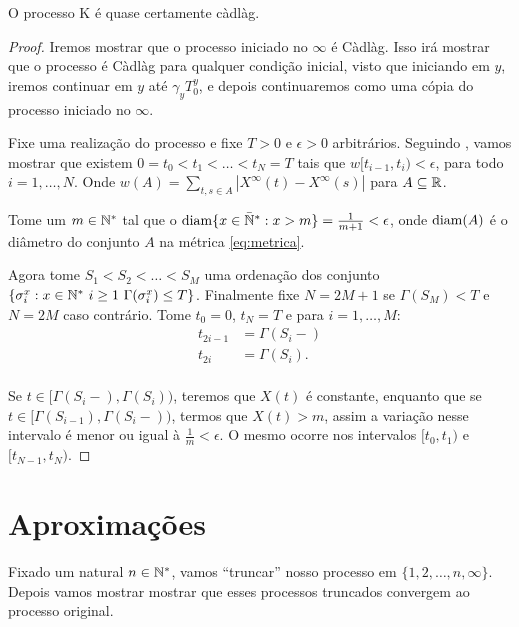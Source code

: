 \begin{proposicao}
  \label{prop:proc-cadlag}
  O processo K é quase certamente càdlàg.
\end{proposicao}
\begin{proof}

  Iremos mostrar que o processo iniciado no $\infty$ é Càdlàg. Isso
  irá mostrar que o processo é Càdlàg para qualquer condição inicial,
  visto que iniciando em $y$, iremos continuar em $y$ até $\gamma_y
  T^y_0$, e depois continuaremos como uma cópia do processo iniciado no
  $\infty$.

  Fixe uma realização do processo e fixe $T > 0$ e $\epsilon > 0$
  arbitrários. Seguindo \cite{billingsley:99}, vamos mostrar que
  existem $0 = t_0 < t_1 < \ldots < t_N = T$ tais que $w[t_{i-1}, t_i)
  < \epsilon$, para todo $i = 1, \ldots, N$. Onde $w(A) = \sum_{t, s
    \in A} |X^\infty(t) - X^\infty(s)|$ para $A \subseteq {\mathbb{R}}$.

  Tome um $m \in {\mathbb{N^*}}$ tal que o ${\mathrm{diam}}\{x \in {\mathbb{\bar{N}^*}}: x > m \} =
  \frac{1}{m+1} < \epsilon$, onde ${\mathrm{diam}}(A)$ é o diâmetro do conjunto
  $A$ na métrica \eqref{eq:metrica}.

  Agora tome $S_1 < S_2 < \ldots < S_M$ uma ordenação dos conjunto $\{
  \sigma^x_i: x \in {\mathbb{N^*}} \,\, i \geq 1 \,\, \Gamma(\sigma^x_i) \leq
  T\}$. Finalmente fixe $N = 2M+1$ se $\Gamma(S_M) < T$ e $N = 2M$
  caso contrário. Tome $t_0 = 0$, $t_N = T$ e para $i=1,\ldots, M$:
  \begin{align*}
    t_{2i-1} &= \Gamma(S_i-)\\
    t_{2i} &= \Gamma(S_i).\\
  \end{align*}

  Se $t \in [\Gamma(S_i-), \Gamma(S_i))$, teremos que
  $X(t)$ é constante, enquanto que se $t \in
  [\Gamma(S_{i-1}), \Gamma(S_{i}-))$, termos que
  $X(t) > m$, assim a variação nesse intervalo é menor ou igual
  à $\frac{1}{m} < \epsilon$. O mesmo ocorre nos intervalos $[t_0,
  t_1)$ e $[t_{N-1}, t_N)$.
\end{proof}




\section{Aproximações}
\label{sec:aproximacoes}

Fixado um natural $n \in {\mathbb{N^*}}$, vamos ``truncar'' nosso processo em
$\{1, 2, \ldots, n, \infty\}$. Depois vamos mostrar mostrar que esses
processos truncados convergem ao processo original.

